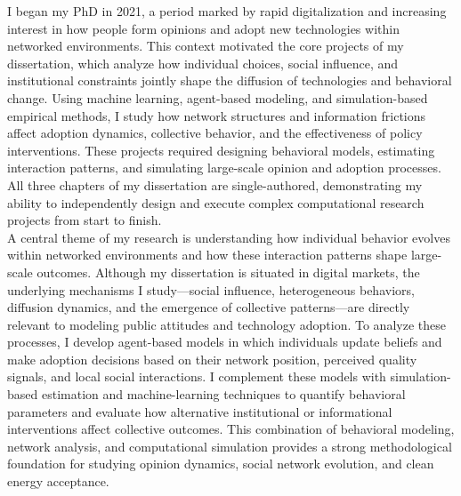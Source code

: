 \documentclass{nfr}
\begin{document}
I began my PhD in 2021, a period marked by rapid digitalization and increasing interest in how people form opinions and adopt new technologies within networked environments. 
This context motivated the core projects of my dissertation, which analyze how individual choices, social influence, and institutional constraints jointly shape the diffusion of technologies and behavioral change. 
Using machine learning, agent-based modeling, and simulation-based empirical methods, I study how network structures and information frictions affect adoption dynamics, collective behavior, and the effectiveness of policy interventions. 
These projects required designing behavioral models, estimating interaction patterns, and simulating large-scale opinion and adoption processes. 
All three chapters of my dissertation are single-authored, demonstrating my ability to independently design and execute complex computational research projects from start to finish.\\

A central theme of my research is understanding how individual behavior evolves within networked environments and how these interaction patterns shape large-scale outcomes. 
Although my dissertation is situated in digital markets, the underlying mechanisms I study—social influence, heterogeneous behaviors, diffusion dynamics, and the emergence of collective patterns—are directly relevant to modeling public attitudes and technology adoption. 
To analyze these processes, I develop agent-based models in which individuals update beliefs and make adoption decisions based on their network position, perceived quality signals, and local social interactions. 
I complement these models with simulation-based estimation and machine-learning techniques to quantify behavioral parameters and evaluate how alternative institutional or informational interventions affect collective outcomes. 
This combination of behavioral modeling, network analysis, and computational simulation provides a strong methodological foundation for studying opinion dynamics, social network evolution, and clean energy acceptance.\\
\end{document}
